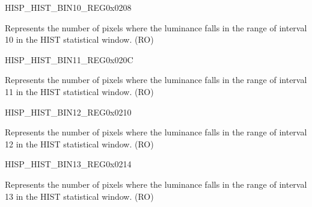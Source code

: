\begin{register}{H}{ISP\_HIST\_BIN10\_REG}{0x0208}\label{regdesc:ISPHISTBIN10REG}
%
%
\regnewline%
\begin{regdesc}\begin{reglist}
\label{fielddesc:ISPHISTBIN10}\item [ISP\_HIST\_BIN\_10] Represents the number of pixels where the luminance falls in the range of interval 10 in the HIST statistical window. (RO)
\end{reglist}\end{regdesc}
\end{register}


\begin{register}{H}{ISP\_HIST\_BIN11\_REG}{0x020C}\label{regdesc:ISPHISTBIN11REG}
%
%
\regnewline%
\begin{regdesc}\begin{reglist}
\label{fielddesc:ISPHISTBIN11}\item [ISP\_HIST\_BIN\_11] Represents the number of pixels where the luminance falls in the range of interval 11 in the HIST statistical window. (RO)
\end{reglist}\end{regdesc}
\end{register}


\begin{register}{H}{ISP\_HIST\_BIN12\_REG}{0x0210}\label{regdesc:ISPHISTBIN12REG}
%
%
\regnewline%
\begin{regdesc}\begin{reglist}
\label{fielddesc:ISPHISTBIN12}\item [ISP\_HIST\_BIN\_12] Represents the number of pixels where the luminance falls in the range of interval 12 in the HIST statistical window. (RO)
\end{reglist}\end{regdesc}
\end{register}


\begin{register}{H}{ISP\_HIST\_BIN13\_REG}{0x0214}\label{regdesc:ISPHISTBIN13REG}
%
%
\regnewline%
\begin{regdesc}\begin{reglist}
\label{fielddesc:ISPHISTBIN13}\item [ISP\_HIST\_BIN\_13] Represents the number of pixels where the luminance falls in the range of interval 13 in the HIST statistical window. (RO)
\end{reglist}\end{regdesc}
\end{register}


